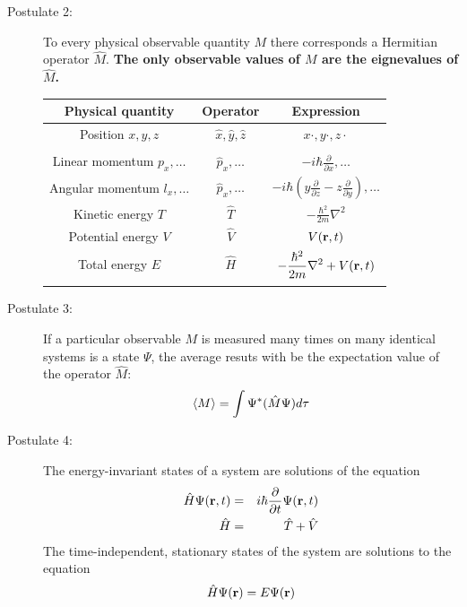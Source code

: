 \message{ !name(Outline.tex)}\documentclass[11pt]{article}
\begin{document}
\begin{outline}
\begin{table}
\begin{center}
\begin{description}
  \item[Postulate 2:]  To every physical observable quantity $M$ there corresponds a
    Hermitian operator $\hat{M}$.  {\bf The only observable values of $M$ are the
      eignevalues of $\hat{M}$.}
    \begin{center}
    \begin{tabular}[h]{ccc}
      \hline
{\bf Physical quantity} & {\bf Operator} & {\bf Expression} \\
\hline
Position $x,y,z$ & $\hat{x},\hat{y},\hat{z}$ & $x\cdot, y\cdot, z\cdot$ \\ \\
Linear momentum $p_x, \ldots$ & $\hat{p}_x,\ldots $ & $\displaystyle -i\hbar\frac{\partial}{\partial
  x},\ldots $\\
Angular momentum $l_x, \ldots$ & $\hat{p}_x,\ldots $ & $\displaystyle -i\hbar \left
  (y\frac{\partial}{\partial z}-z\frac{\partial}{\partial y}\right ), \ldots $ \\
Kinetic energy $T$ & $\hat{T}$ & $\displaystyle -\frac{\hbar^2}{2m}\nabla^2$ \\
Potential energy $V$ & $\hat{V}$ & $V({\bf r},t)$ \\
Total energy $E$ & $\hat{H}$ & $\displaystyle -\frac{\hbar^2}{2m}\nabla^2+V({\bf r},t)$\\ \\
\hline
    \end{tabular}
  \end{center}
    \item[Postulate 3:] {If a particular observable $M$ is measured many times on many
      identical systems is a state $\Psi$, the average resuts with be the expectation
      value of the operator $\hat{M}$:
      \begin{equation*}
        \langle M \rangle = \int \Psi^* (\hat{M}\Psi)d{\bf\tau}
      \end{equation*}}
    \item[Postulate 4:] {The energy-invariant states of a system are solutions of the equation
        \begin{eqnarray*}
          \hat{H}\Psi({\bf r},t) & = & i\hbar\frac{\partial}{\partial t}\Psi({\bf r},t) \\
          \hat{H} & = & \hat{T}+\hat{V}
        \end{eqnarray*}
      The time-independent, stationary states of the system are solutions to the equation
      \begin{equation*}
        \hat{H}\Psi({\bf r}) = E\Psi(\bf{r})
      \end{equation*}
}
\end{description}
\end{center}
\end{table}
\end{outline}
\end{document}
